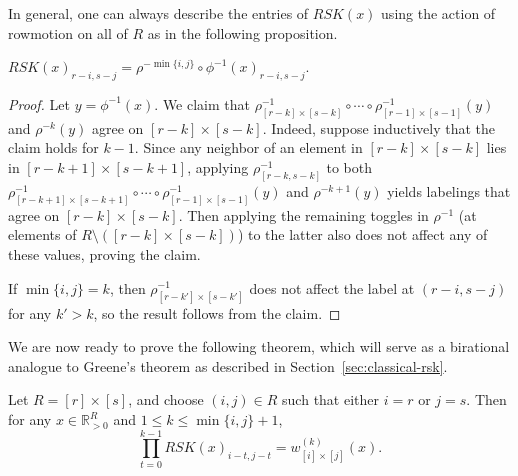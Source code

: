 \documentclass[ALCO,Unicode,published]{cedram}
\numberwithin{equation}{section}
\begin{document}
In general, one can always describe the entries of $RSK(x)$ using the action of rowmotion on all of $R$ as in the following proposition. 

\begin{Prop}
$RSK(x)_{r-i,s-j} = \rho^{-\min\{i,j\}} \circ \phi^{-1}(x)_{r-i,s-j}.$
\label{Cor:RSKasRowmotion}
\end{Prop}

\begin{proof} 
Let $y = \phi^{-1}(x)$. We claim that $\rho_{[r-k]\times[s-k]}^{-1} \circ \cdots \circ \rho^{-1}_{[r-1]\times[s-1]}(y)$ and $\rho^{-k} (y)$ agree on $[r-k]\times[s-k]$. Indeed, suppose inductively that the claim holds for $k-1$. Since any neighbor of an element in $[r-k] \times [s-k]$ lies in $[r-k+1] \times [s-k+1]$, applying $\rho^{-1}_{[r-k,s-k]}$ to both $\rho_{[r-k+1]\times[s-k+1]}^{-1} \circ \cdots \circ \rho^{-1}_{[r-1]\times[s-1]}(y)$ and $\rho^{-k+1} (y)$ yields labelings that agree on $[r-k]\times[s-k]$. Then applying the remaining toggles in $\rho^{-1}$ (at elements of $R \setminus ([r-k] \times [s-k])$) to the latter also does not affect any of these values, proving the claim.

If $\min\{i,j\} = k$, then $\rho_{[r-k']\times[s-k']}^{-1}$ does not affect the label at $(r-i,s-j)$ for any $k'>k$, so the result follows from the claim.
\end{proof}


We are now ready to prove the following theorem, which will serve as a birational analogue to Greene's theorem as described in Section~\ref{sec:classical-rsk}.

\begin{Th} \label{plGreene}
Let $R = [r] \times [s]$, and choose $(i,j) \in R$ such that either $i = r$ or $j = s$. Then for any $x \in \mathbb R^{R}_{>0}$ and $1\leq k \leq \min \{i,j\}+1$,
\[\prod_{t=0}^{k-1} RSK(x)_{i-t,j-t} = w_{[i]\times[j]}^{(k)}(x).\]
\end{Th}
\end{document}
